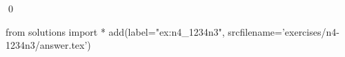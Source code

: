 \begin{ex}
  \label{ex:n4_1234n3}
  
  \mbox{}\\ \\
  \qed
\end{ex}
\begin{python0}
from solutions import *
add(label="ex:n4_1234n3",
    srcfilename='exercises/n4-1234n3/answer.tex') 
\end{python0}                              
